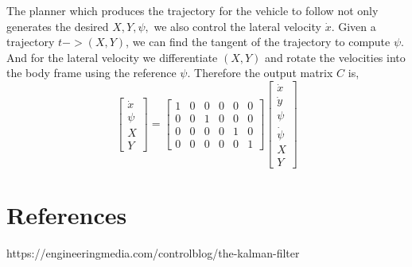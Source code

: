 \documentclass{article}
\begin{document}
The planner which produces the trajectory for the vehicle to follow not only generates the desired $X,Y,\psi,$ we also
control the lateral velocity $\dot{x}$. Given a trajectory $t -> (X, Y)$, we can find the tangent of the trajectory to
compute $\psi$. And for the lateral velocity we differentiate $(X, Y)$ and rotate the velocities into the body frame
using the reference $\psi$. Therefore the output matrix $C$ is,
\begin{equation}
    \begin{bmatrix} \dot{x} \\ \psi \\ X \\ Y \end{bmatrix}
    =
    \begin{bmatrix}
        1 & 0 & 0 & 0 & 0 & 0 \\
        0 & 0 & 1 & 0 & 0 & 0 \\
        0 & 0 & 0 & 0 & 1 & 0 \\
        0 & 0 & 0 & 0 & 0 & 1
    \end{bmatrix}
    \begin{bmatrix} \dot{x} \\ \dot{y} \\ \psi \\ \dot{\psi} \\ X \\ Y \end{bmatrix}
\end{equation}

\section{References}

https://engineeringmedia.com/controlblog/the-kalman-filter
\end{document}
